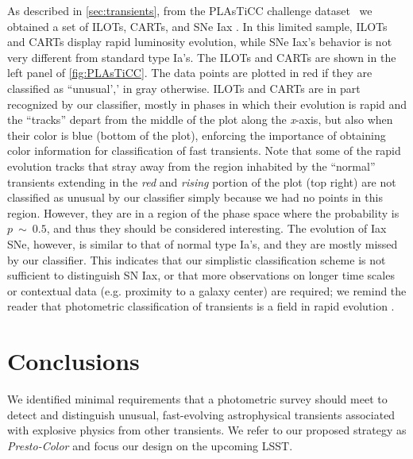 \documentclass[letterpaper,longauthor,trackchanges,twocolumn,onecolappendix,sort&compress]{aastex62}
\begin{document}
As described in \autoref{sec:transients}, from the PLAsTiCC challenge dataset~\citep{plasticc} we obtained a set of  ILOTs, CARTs, and SNe Iax \citep[][and references therein]{Jha2017}. In this limited sample, ILOTs and CARTs display rapid luminosity evolution, while SNe Iax's behavior is not very different from standard type Ia's. The ILOTs and CARTs are shown in the left panel of \autoref{fig:PLAsTiCC}. The data points are plotted in red if they are classified as ``unusual',' in gray otherwise. ILOTs and CARTs are in part recognized by our classifier, mostly in phases in which their evolution is rapid and the ``tracks'' depart from the middle of the plot along the \emph{x}-axis, but also when their color is blue (bottom of the plot), enforcing the importance of obtaining color information for classification of fast transients. Note that some of the rapid evolution tracks that stray away from the region inhabited by the ``normal'' transients extending in the \emph{red} and \emph{rising} portion of the plot (top right) are not classified as unusual by our classifier simply because we had no points in this region. However, they are in a region of the phase space where the probability is $p~\sim~0.5$, and thus they should be considered interesting. The evolution of Iax SNe, however, is similar to that of normal type Ia's, and they are mostly missed by our classifier. This indicates that our simplistic classification scheme is not sufficient to distinguish SN Iax, or that more observations on longer time scales or contextual data (e.g. proximity to a galaxy center) are required; we remind the reader that photometric classification of transients is a field in rapid evolution \citep[\emph{e.g.}][]{plasticc}.

\section{Conclusions}
We identified minimal requirements that a photometric survey should meet to detect and distinguish unusual, fast-evolving astrophysical transients associated with explosive physics from other transients. We refer to our proposed strategy as {\em Presto-Color} and focus our design on the upcoming LSST. 
\end{document}
